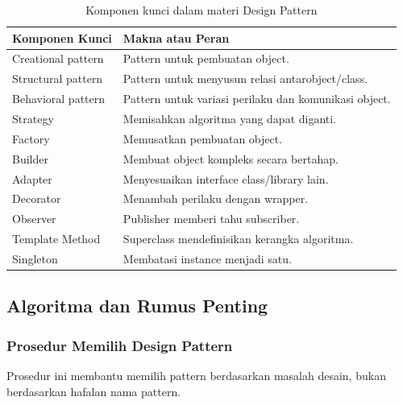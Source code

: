 \begin{table}[H]
\centering
\begin{tabularx}{\textwidth}{|L{0.28\textwidth}|X|}
\hline
\textbf{Komponen Kunci} & \textbf{Makna atau Peran} \\
\hline
Creational pattern & Pattern untuk pembuatan object. \\
\hline
Structural pattern & Pattern untuk menyusun relasi antarobject/class. \\
\hline
Behavioral pattern & Pattern untuk variasi perilaku dan komunikasi object. \\
\hline
Strategy & Memisahkan algoritma yang dapat diganti. \\
\hline
Factory & Memusatkan pembuatan object. \\
\hline
Builder & Membuat object kompleks secara bertahap. \\
\hline
Adapter & Menyesuaikan interface class/library lain. \\
\hline
Decorator & Menambah perilaku dengan wrapper. \\
\hline
Observer & Publisher memberi tahu subscriber. \\
\hline
Template Method & Superclass mendefinisikan kerangka algoritma. \\
\hline
Singleton & Membatasi instance menjadi satu. \\
\hline
\end{tabularx}
\caption{Komponen kunci dalam materi Design Pattern}
\label{tab:komponen-kunci-design-pattern}
\end{table}

\subsection{Algoritma dan Rumus Penting}

\subsubsection{Prosedur Memilih Design Pattern}

\begin{jawab}
Prosedur ini membantu memilih pattern berdasarkan masalah desain, bukan berdasarkan hafalan nama pattern.
\end{jawab}

